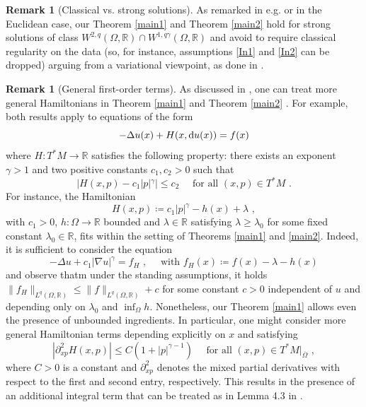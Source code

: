 \documentclass[10pt, a4paper, reqno, oneside]{amsart}
\theoremstyle{plain}
\theoremstyle{definition}
\newtheorem{rem}[theo]{Remark}
\theoremstyle{plain}
\theoremstyle{definition}
\theoremstyle{plain}
\renewcommand{\=}{:=}
\begin{document}
\begin{rem}[Classical vs. strong solutions] \label{remClass-Str}
As remarked in e.g. \cite[Remark 3]{CGell} or \cite{BardiPerthame} in the Euclidean case, our Theorem \ref{main1} and Theorem \ref{main2} hold for strong solutions of class $W^{2,q}(\Omega,\mathbb{R}) \cap W^{1,q\gamma}(\Omega,\mathbb{R})$ and avoid to require classical regularity on the data (so, for instance, assumptions \eqref{In1} and \eqref{In2} can be dropped) arguing from a variational viewpoint, as done in \cite{CGell}.
\end{rem}

\begin{rem}[General first-order terms] \label{Hgen}
As discussed in \cite[Remark 4]{CGell}, one can treat more general Hamiltonians in Theorem \ref{main1} and Theorem \ref{main2} . For example, both results apply to equations of the form
$$
-\Delta u(x)+ H(x,{\rm d} u(x))=f(x)
$$
where $H : T^*M \to \mathbb{R}$ satisfies the following property: there exists an exponent $\gamma>1$ and two positive constants $c_1,c_2 >0$ such that
$$
|H(x,p)-c_1|p|^\gamma|\leq c_2 \quad \text{ for all } (x,p) \in T^*M \,\, .
$$
For instance, the Hamiltonian
$$
H(x,p) \coloneqq c_1|p|^\gamma -h(x) +\lambda \,\, ,
$$
with $c_1>0$, $h : \Omega \to \mathbb{R}$ bounded and $\lambda \in \mathbb{R}$ satisfying $\lambda \geq \lambda_0$ for some fixed constant $\lambda_0 \in \mathbb{R}$, fits within the setting of Theorems \ref{main1} and \ref{main2}. Indeed, it is sufficient to consider the equation
$$
-\Delta u +c_1|\nabla u|^\gamma = f_H \,\, , \quad \text{ with } f_H(x) \coloneqq f(x) -\lambda -h(x)
$$
and observe thatm under the standing assumptions, it holds $\|f_H\|_{L^q(\Omega,\mathbb{R})} \leq \|f\|_{L^q(\Omega,\mathbb{R})} +c$ for some constant $c>0$ independent of $u$ and depending only on $\lambda_0$ and $\inf_\Omega h$. Nonetheless, our Theorem \ref{main1} allows even the presence of unbounded ingredients. In particular, one might consider more general Hamiltonian terms depending explicitly on $x$ and satisfying
$$
|\partial_{xp}^2H(x,p)|\leq C(1+|p|^{\gamma-1}) \quad \text{ for all $(x,p) \in T^*M|_{\overline{\Omega}}$} \,\, ,
$$
where $C>0$ is a constant and $\partial_{xp}^2$ denotes the mixed partial derivatives with respect to the first and second entry, respectively. This results in the presence of an additional integral term that can be treated as in Lemma 4.3 in \cite{PV}.
\end{rem}
\end{document}
